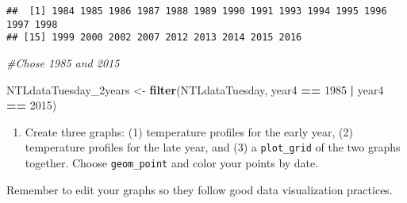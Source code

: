 \documentclass[]{article}
\newenvironment{Shaded}{\begin{snugshade}}{\end{snugshade}}
\newcommand{\CommentTok}[1]{\textcolor[rgb]{0.56,0.35,0.01}{\textit{#1}}}
\newcommand{\DecValTok}[1]{\textcolor[rgb]{0.00,0.00,0.81}{#1}}
\newcommand{\KeywordTok}[1]{\textcolor[rgb]{0.13,0.29,0.53}{\textbf{#1}}}
\newcommand{\NormalTok}[1]{#1}
\newcommand{\OperatorTok}[1]{\textcolor[rgb]{0.81,0.36,0.00}{\textbf{#1}}}
\newcommand{\StringTok}[1]{\textcolor[rgb]{0.31,0.60,0.02}{#1}}
\providecommand{\tightlist}{%
  \setlength{\itemsep}{0pt}\setlength{\parskip}{0pt}}
\begin{document}
\begin{Shaded}
\end{Shaded}

\begin{verbatim}
##  [1] 1984 1985 1986 1987 1988 1989 1990 1991 1993 1994 1995 1996 1997 1998
## [15] 1999 2000 2002 2007 2012 2013 2014 2015 2016
\end{verbatim}

\begin{Shaded}
\begin{Highlighting}[]
\CommentTok{#Chose 1985 and 2015}

\NormalTok{NTLdataTuesday_2years <-}\StringTok{ }\KeywordTok{filter}\NormalTok{(NTLdataTuesday, year4 }\OperatorTok{==}\StringTok{ }\DecValTok{1985} \OperatorTok{|}\StringTok{ }\NormalTok{year4 }\OperatorTok{==}\StringTok{ }\DecValTok{2015}\NormalTok{)}
\end{Highlighting}
\end{Shaded}

\begin{enumerate}
\def\labelenumi{\arabic{enumi}.}
\setcounter{enumi}{5}
\tightlist
\item
  Create three graphs: (1) temperature profiles for the early year, (2)
  temperature profiles for the late year, and (3) a \texttt{plot\_grid}
  of the two graphs together. Choose \texttt{geom\_point} and color your
  points by date.
\end{enumerate}

Remember to edit your graphs so they follow good data visualization
practices.

\begin{Shaded}
\end{Shaded}
\end{document}
